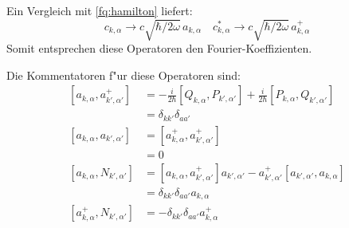 Ein Vergleich mit \ref{fq:hamilton} liefert:
\begin{equation}
 c_{k,\alpha} \rightarrow c \sqrt{\hbar/2 \omega} \, a_{k,\alpha} \quad c^*_{k,\alpha} \rightarrow c \sqrt{\hbar/2 \omega} \, a^+_{k,\alpha}
\end{equation}
Somit entsprechen diese Operatoren den Fourier-Koeffizienten.

Die Kommentatoren f"ur diese Operatoren sind:
\begin{equation}
\begin{split}
[a_{k,\alpha} , a^+_{k',\alpha'}] &= - \frac{i}{2 \hbar} [Q_{k,\alpha}, P_{k',\alpha'}] + \frac{i}{2 \hbar} [P_{k,\alpha}, Q_{k',\alpha'}] \\
	 &= \delta_{kk'}\delta_{aa'} \\
[a_{k,\alpha} , a_{k',\alpha'}] &= [a^+_{k,\alpha} , a^+_{k',\alpha'}] \\
	 &= 0 \\
[a_{k,\alpha} , N_{k',\alpha'}] &= [a_{k,\alpha} , a^+_{k',\alpha'}]a_{k',\alpha'} - a^+_{k',\alpha'}[a_{k',\alpha'} , a_{k,\alpha}]\\
	&= \delta_{kk'}\delta_{aa'} a_{k,\alpha} \\
[a^+_{k,\alpha} , N_{k',\alpha'}] &= -\delta_{kk'}\delta_{aa'} a^+_{k,\alpha}
\end{split}
\end{equation}

